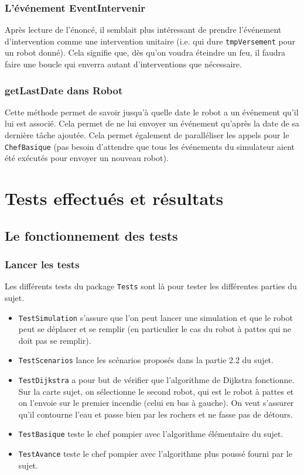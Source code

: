 \documentclass[a4paper,8pt]{article} %
\begin{document}
\subsubsection{L'événement EventIntervenir}
Après lecture de l'énoncé, il semblait plus intéressant de prendre l'événement d'intervention comme une intervention unitaire
(i.e. qui dure \texttt{tmpVersement} pour un robot donné). Cela signifie que, dès qu'on voudra éteindre un feu, il faudra faire une 
boucle qui enverra autant d'interventions que nécessaire.
\subsubsection{getLastDate dans Robot}
Cette méthode permet de savoir jusqu'à quelle date le robot a un événement qu'il lui est associé. Cela permet de ne lui envoyer un événement
qu'après la date de sa dernière tâche ajoutée. Cela permet également de paralléliser les appels pour le \texttt{ChefBasique} 
(pas besoin d'attendre que tous les événements du simulateur aient été exécutés pour envoyer un nouveau robot).

\section{Tests effectués et résultats}
\subsection{Le fonctionnement des tests}
\subsubsection{Lancer les tests}
Les différents tests du package \texttt{Tests} sont là pour tester les différentes parties du sujet.
\begin{itemize}
    \item \texttt{TestSimulation} s'assure que l'on peut lancer une simulation et que le robot peut se déplacer et se remplir
    (en particulier le cas du robot à pattes qui ne doit pas se remplir).
    \item \texttt{TestScenarios} lance les scénarios proposés dans la partie 2.2 du sujet.
    \item \texttt{TestDijkstra} a pour but de vérifier que l'algorithme de Dijkstra fonctionne. Sur la carte sujet, 
    on sélectionne le second robot, qui est le robot à pattes et on l'envoie sur le premier incendie (celui en bas à gauche).
    On veut s'assurer qu'il contourne l'eau et passe bien par les rochers et ne fasse pas de détours.
    \item \texttt{TestBasique} teste le chef pompier avec l'algorithme élémentaire du sujet.
    \item \texttt{TestAvance} teste le chef pompier avec l'algorithme plus poussé fourni par le sujet.
\end{itemize}
\end{document}
